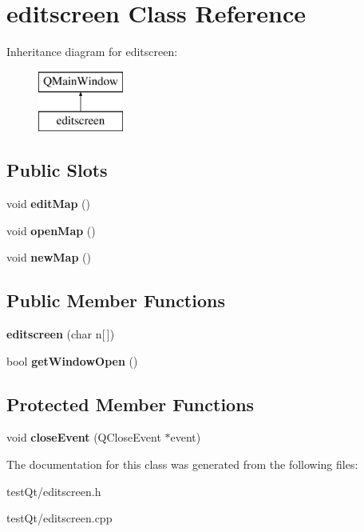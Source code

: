 \hypertarget{classeditscreen}{}\section{editscreen Class Reference}
\label{classeditscreen}
Inheritance diagram for editscreen\+:\begin{figure}[H]
\begin{center}
\leavevmode
\includegraphics[height=2.000000cm]{classeditscreen}
\end{center}
\end{figure}
\subsection*{Public Slots}
\begin{DoxyCompactItemize}
\item 
\hypertarget{classeditscreen_ab87d295b62477e294f9436a2fc1087c0}{}\label{classeditscreen_ab87d295b62477e294f9436a2fc1087c0} 
void {\bfseries edit\+Map} ()
\item 
\hypertarget{classeditscreen_a054d2cef9dbc1bee9c4d29997eb7ef43}{}\label{classeditscreen_a054d2cef9dbc1bee9c4d29997eb7ef43} 
void {\bfseries open\+Map} ()
\item 
\hypertarget{classeditscreen_a2a62dec2be10d0aa5794d05429b7c2d5}{}\label{classeditscreen_a2a62dec2be10d0aa5794d05429b7c2d5} 
void {\bfseries new\+Map} ()
\end{DoxyCompactItemize}
\subsection*{Public Member Functions}
\begin{DoxyCompactItemize}
\item 
\hypertarget{classeditscreen_a7bc46501132eccf581229a731447167a}{}\label{classeditscreen_a7bc46501132eccf581229a731447167a} 
{\bfseries editscreen} (char n\mbox{[}$\,$\mbox{]})
\item 
\hypertarget{classeditscreen_a1be9e42a7542805e5f055f1a8a801e69}{}\label{classeditscreen_a1be9e42a7542805e5f055f1a8a801e69} 
bool {\bfseries get\+Window\+Open} ()
\end{DoxyCompactItemize}
\subsection*{Protected Member Functions}
\begin{DoxyCompactItemize}
\item 
\hypertarget{classeditscreen_a8ce99f3ff10200fe7d5d2686945a4257}{}\label{classeditscreen_a8ce99f3ff10200fe7d5d2686945a4257} 
void {\bfseries close\+Event} (Q\+Close\+Event $\ast$event)
\end{DoxyCompactItemize}


The documentation for this class was generated from the following files\+:\begin{DoxyCompactItemize}
\item 
test\+Qt/editscreen.\+h\item 
test\+Qt/editscreen.\+cpp\end{DoxyCompactItemize}
